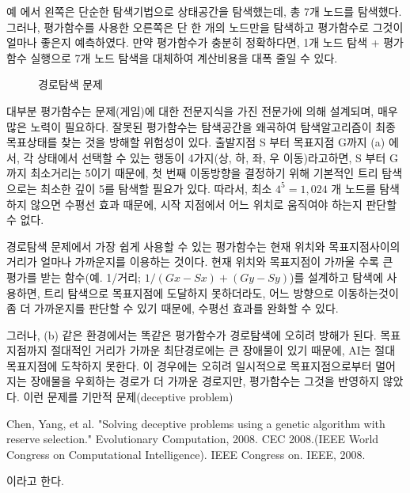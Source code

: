 \documentclass[letterpaper,10pt,english]{sphinxmanual}
\begin{document}
{\hyperref[\detokenize{03-basic_ai_examples:eval-func-fig}]{}} 예 에서 왼쪽은 단순한 탐색기법으로 상태공간을 탐색했는데, 총 7개 노드를 탐색했다.
그러나, 평가함수를 사용한 오른쪽은 단 한 개의 노드만을 탐색하고 평가함수로 그것이 얼마나 좋은지 예측하였다.
만약 평가함수가 충분히 정확하다면, 1개 노드 탐색 + 평가함수 실행으로 7개 노드 탐색을 대체하여 계산비용을 대폭 줄일 수 있다.

\begin{figure}[htbp]
\centering
\capstart

\noindent{}
\caption{경로탐색 문제}\label{\detokenize{03-basic_ai_examples:path-finding}}\label{\detokenize{03-basic_ai_examples:id39}}\end{figure}

대부분 평가함수는 문제(게임)에 대한 전문지식을 가진 전문가에 의해 설계되며, 매우 많은 노력이 필요하다.
잘못된 평가함수는 탐색공간을 왜곡하여 탐색알고리즘이 최종 목표상태를 찾는 것을 방해할 위험성이 있다.
출발지점 S 부터 목표지점 G까지 {\hyperref[\detokenize{03-basic_ai_examples:path-finding}]{}} (a) 에서, 각 상태에서 선택할 수 있는 행동이 4가지(상, 하, 좌, 우 이동)라고하면,
S 부터 G까지 최소거리는 5이기 때문에, 첫 번째 이동방향을 결정하기 위해 기본적인 트리 탐색으로는 최소한 깊이 5를 탐색할 필요가 있다.
따라서, 최소 \(4^5 = 1,024\) 개 노드를 탐색하지 않으면 수평선 효과 때문에, 시작 지점에서 어느 위치로 움직여야 하는지 판단할 수 없다.

경로탐색 문제에서 가장 쉽게 사용할 수 있는 평가함수는 현재 위치와 목표지점사이의 거리가 얼마나 가까운지를 이용하는 것이다.
현재 위치와 목표지점이 가까울 수록 큰 평가를 받는 함수(예. 1/거리; \(1 / (Gx - Sx) + (Gy - Sy)\))를 설계하고 탐색에 사용하면,
트리 탐색으로 목표지점에 도달하지 못하더라도, 어느 방향으로 이동하는것이 좀 더 가까운지를 판단할 수 있기 때문에,
수평선 효과를 완화할 수 있다.

그러나, {\hyperref[\detokenize{03-basic_ai_examples:path-finding}]{}} (b) 같은 환경에서는 똑같은 평가함수가 경로탐색에 오히려 방해가 된다.
목표지점까지 절대적인 거리가 가까운 최단경로에는 큰 장애물이 있기 때문에, AI는 절대 목표지점에 도착하지 못한다.
이 경우에는 오히려 일시적으로 목표지점으로부터 멀어지는 장애물을 우회하는 경로가 더 가까운 경로지만,
평가함수는 그것을 반영하지 않았다. 이런 문제를 기만적 문제(deceptive problem) %
\begin{footnote}[8]\sphinxAtStartFootnote
Chen, Yang, et al. "Solving deceptive problems using a genetic algorithm with reserve selection." Evolutionary Computation, 2008. CEC 2008.(IEEE World Congress on Computational Intelligence). IEEE Congress on. IEEE, 2008.
%
\end{footnote} 이라고 한다.
\end{document}
